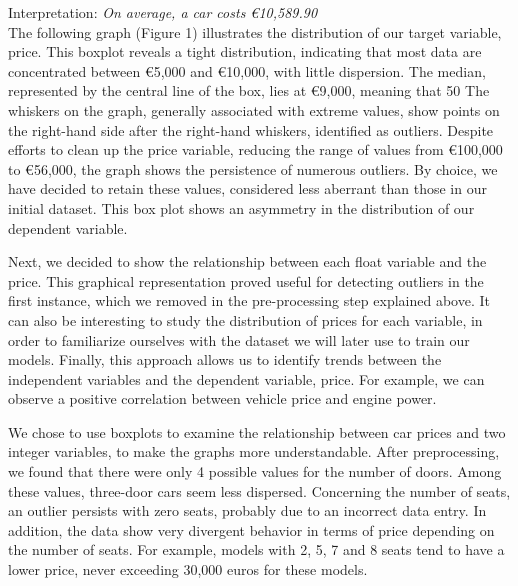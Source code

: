 \documentclass[12pt]{article}
\begin{document}
\FloatBarrier

\noindent Interpretation: \textit{On average, a car costs €10,589.90} \\

\noindent The following graph (Figure 1) illustrates the distribution of our target variable, price. This boxplot reveals a tight distribution, indicating that most data are concentrated between €5,000 and €10,000, with little dispersion. The median, represented by the central line of the box, lies at €9,000, meaning that 50 %
\noindent The whiskers on the graph, generally associated with extreme values, show points on the right-hand side after the right-hand whiskers, identified as outliers. Despite efforts to clean up the price variable, reducing the range of values from €100,000 to €56,000, the graph shows the persistence of numerous outliers. By choice, we have decided to retain these values, considered less aberrant than those in our initial dataset.
\noindent This box plot shows an asymmetry in the distribution of our dependent variable.


\noindent Next, we decided to show the relationship between each float variable and the price. This graphical representation proved useful for detecting outliers in the first instance, which we removed in the pre-processing step explained above. It can also be interesting to study the distribution of prices for each variable, in order to familiarize ourselves with the dataset we will later use to train our models. Finally, this approach allows us to identify trends between the independent variables and the dependent variable, price. For example, we can observe a positive correlation between vehicle price and engine power.



\noindent We chose to use boxplots to examine the relationship between car prices and two integer variables, to make the graphs more understandable. After preprocessing, we found that there were only 4 possible values for the number of doors. Among these values, three-door cars seem less dispersed. Concerning the number of seats, an outlier persists with zero seats, probably due to an incorrect data entry. In addition, the data show very divergent behavior in terms of price depending on the number of seats. For example, models with 2, 5, 7 and 8 seats tend to have a lower price, never exceeding 30,000 euros for these models.
\end{document}

